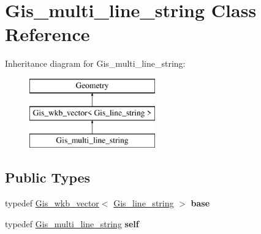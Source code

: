 \hypertarget{classGis__multi__line__string}{}\section{Gis\+\_\+multi\+\_\+line\+\_\+string Class Reference}
\label{classGis__multi__line__string}
Inheritance diagram for Gis\+\_\+multi\+\_\+line\+\_\+string\+:\begin{figure}[H]
\begin{center}
\leavevmode
\includegraphics[height=3.000000cm]{classGis__multi__line__string}
\end{center}
\end{figure}
\subsection*{Public Types}
\begin{DoxyCompactItemize}
\item 
\mbox{\label{classGis__multi__line__string_aec6ec890ae4ed2d5cdc23a8042b40b87}} 
typedef \mbox{\hyperlink{classGis__wkb__vector}{Gis\+\_\+wkb\+\_\+vector}}$<$ \mbox{\hyperlink{classGis__line__string}{Gis\+\_\+line\+\_\+string}} $>$ {\bfseries base}
\item 
\mbox{\label{classGis__multi__line__string_a519cb4b08618f5ca6bd56c0a11063b2c}} 
typedef \mbox{\hyperlink{classGis__multi__line__string}{Gis\+\_\+multi\+\_\+line\+\_\+string}} {\bfseries self}
\end{DoxyCompactItemize}
